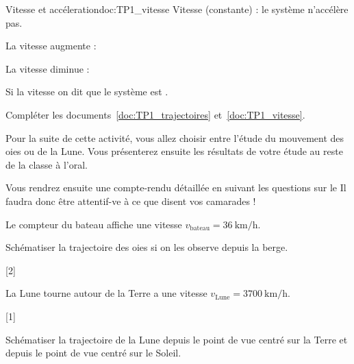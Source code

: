 \begin{doc}{Vitesse et accéleration}{doc:TP1_vitesse}
  Vitesse  (constante) : le système n’accélère pas.
  
  La vitesse augmente : 
  
  La vitesse diminue : 
  
  Si la vitesse  on dit que le système est .
\end{doc}


\numeroQuestion
Compléter les documents~\ref{doc:TP1_trajectoires} et~\ref{doc:TP1_vitesse}.

\fleche Pour la suite de cette activité, vous allez choisir entre l'étude du mouvement des oies ou de la Lune.
Vous présenterez ensuite les résultats de votre étude au reste de la classe à l'oral.

\fleche Vous rendrez ensuite une compte-rendu détaillée en suivant les questions sur le 
Il faudra donc être attentif-ve à ce que disent vos camarades !


\pasCorrection{ \newpage \vspace*{-40pt} }

Le compteur du bateau affiche une vitesse $v_\text{bateau} = \qty{36}{\km/\hour}$.


\mesure Schématiser la trajectoire des oies si on les observe depuis la berge.
\vspace*{120pt}

[2]



La Lune tourne autour de la Terre a une vitesse $v_\text{Lune} = \qty{3700}{\km/\hour}$.


[1]

\mesure Schématiser la trajectoire de la Lune depuis le point de vue centré sur la Terre et  depuis le point de vue centré sur le Soleil.
\vspace*{120pt}


